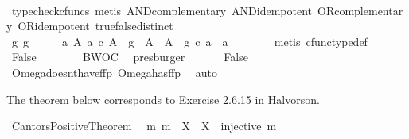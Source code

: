\begin{isabellebody}
\ \ \ \ \ \ \isamarkupfalse%
\ {\isacharparenleft}{\kern0pt}typecheck{\isacharunderscore}{\kern0pt}cfuncs{\isacharcomma}{\kern0pt}\ metis\ AND{\isacharunderscore}{\kern0pt}complementary\ AND{\isacharunderscore}{\kern0pt}idempotent\ OR{\isacharunderscore}{\kern0pt}complementary\ OR{\isacharunderscore}{\kern0pt}idempotent\ true{\isacharunderscore}{\kern0pt}false{\isacharunderscore}{\kern0pt}distinct{\isacharparenright}{\kern0pt}\isanewline
\ \ \ \ \isamarkupfalse%
\ \isamarkupfalse%
\ {\isachardoublequoteopen}{\isasymexists}g{\isachardot}{\kern0pt}\ g\ {\isacharcolon}{\kern0pt}\ {\isasymOmega}\ {\isasymrightarrow}\ {\isasymOmega}\ {\isasymand}\ {\isacharparenleft}{\kern0pt}{\isasymforall}a{\isachardot}{\kern0pt}\ {\isasymforall}A{\isachardot}{\kern0pt}\ a\ {\isasymin}\isactrlsub c\ A\ {\isasymlongrightarrow}\ g\ {\isacharcolon}{\kern0pt}\ A\ {\isasymrightarrow}\ A\ {\isasymlongrightarrow}\ g\ {\isasymcirc}\isactrlsub c\ a\ {\isasymnoteq}\ a{\isacharparenright}{\kern0pt}{\isachardoublequoteclose}\isanewline
\ \ \ \ \ \ \isamarkupfalse%
\ {\isacharparenleft}{\kern0pt}metis\ cfunc{\isacharunderscore}{\kern0pt}type{\isacharunderscore}{\kern0pt}def{\isacharparenright}{\kern0pt}\isanewline
\ \ \ \ \isamarkupfalse%
\ \isamarkupfalse%
\ False\isanewline
\ \ \ \ \ \ \isamarkupfalse%
\ BWOC\ \isamarkupfalse%
\ presburger\isanewline
\ \ \isamarkupfalse%
\isanewline
\ \ \isamarkupfalse%
\ False\isanewline
\ \ \ \ \isamarkupfalse%
\ Omega{\isacharunderscore}{\kern0pt}doesnt{\isacharunderscore}{\kern0pt}have{\isacharunderscore}{\kern0pt}ffp\ Omega{\isacharunderscore}{\kern0pt}has{\isacharunderscore}{\kern0pt}ffp\ \isamarkupfalse%
\ auto\isanewline
{}\isamarkupfalse%
%
\endisatagproof
{\isafoldproof}%
%
\isadelimproof
%
\endisadelimproof
%
\begin{isamarkuptext}%
The theorem below corresponds to Exercise 2.6.15 in Halvorson.%
\end{isamarkuptext}\isamarkuptrue%
\isamarkupfalse%
\ Cantors{\isacharunderscore}{\kern0pt}Positive{\isacharunderscore}{\kern0pt}Theorem{\isacharcolon}{\kern0pt}\isanewline
\ \ {\isachardoublequoteopen}{\isasymexists}m{\isachardot}{\kern0pt}\ m\ {\isacharcolon}{\kern0pt}\ X\ {\isasymrightarrow}\ {\isasymOmega}\isactrlbsup X\isactrlesup \ {\isasymand}\ injective\ m{\isachardoublequoteclose}\isanewline
%
\isadelimproof
%
\endisadelimproof
%
\isatagproof

\end{isabellebody}
